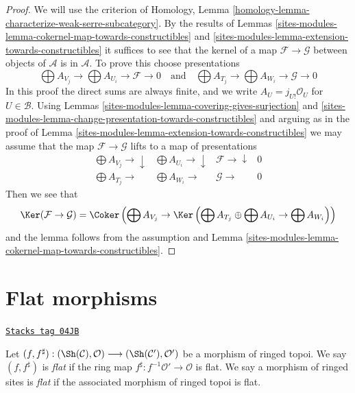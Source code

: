 \begin{proof}
We will use the criterion of
Homology, Lemma \ref{homology-lemma-characterize-weak-serre-subcategory}.
By the results of
Lemmas \ref{sites-modules-lemma-cokernel-map-towards-constructibles} and
\ref{sites-modules-lemma-extension-towards-constructibles}
it suffices to see that the kernel of a map $\mathcal{F} \to \mathcal{G}$
between objects of $\mathcal{A}$ is in $\mathcal{A}$. To prove this
choose presentations
$$
\bigoplus A_{V_j} \to \bigoplus A_{U_i} \to \mathcal{F} \to 0
\quad\text{and}\quad
\bigoplus A_{T_j} \to \bigoplus A_{W_i} \to \mathcal{G} \to 0
$$
In this proof the direct sums are always finite, and
we write $A_U = j_{U!}\mathcal{O}_U$ for $U \in \mathcal{B}$.
Using Lemmas \ref{sites-modules-lemma-covering-gives-surjection} and
\ref{sites-modules-lemma-change-presentation-towards-constructibles}
and arguing as in the proof of
Lemma \ref{sites-modules-lemma-extension-towards-constructibles}
we may assume that the map $\mathcal{F} \to \mathcal{G}$
lifts to a map of presentations
$$
\begin{array}{cccc}\bigoplus A_{V_j} \longrightarrow\downarrow & \bigoplus A_{U_i} \longrightarrow\downarrow & \mathcal{F} \longrightarrow\downarrow & 0 \\ \bigoplus A_{T_j} \longrightarrow & \bigoplus A_{W_i} \longrightarrow & \mathcal{G} \longrightarrow & 0\end{array}
$$
Then we see that
$$
\Ker(\mathcal{F} \to \mathcal{G}) =
\Coker\left(\bigoplus A_{V_j} \to
\Ker\left(
\bigoplus A_{T_j} \oplus \bigoplus A_{U_i} \to \bigoplus A_{W_i}\right)\right)
$$
and the lemma follows from the assumption and
Lemma \ref{sites-modules-lemma-cokernel-map-towards-constructibles}.
\end{proof}

\section{Flat morphisms}
\label{sites-modules-section-flat-morphisms}
\begin{definition}
\label{sites-modules-definition-flat-morphism}
\href{https://stacks.math.columbia.edu/tag/04JB}{\texttt{Stacks tag 04JB}}

Let
$(f, f^\sharp) :
(\Sh(\mathcal{C}), \mathcal{O})
\longrightarrow
(\Sh(\mathcal{C}'), \mathcal{O}')$
be a morphism of ringed topoi. We say $(f, f^\sharp)$ is
{\it flat} if the ring map $f^\sharp : f^{-1}\mathcal{O}' \to \mathcal{O}$
is flat. We say a morphism of ringed sites is {\it flat}
if the associated morphism of ringed topoi is flat.
\end{definition}

